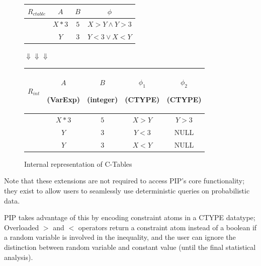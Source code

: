 \begin{figure}
\begin{center}
\begin{tabular}{c|ccc}
$R_{ctable}$ & $A$ & $B$ & $\phi$ \\ \hline
& $X*3$ & $5$ & $X > Y \wedge Y > 3$ \\
& $Y$ & $3$ & $Y < 3 \vee X < Y$ \\
\end{tabular}
\begin{center}
$\Downarrow \Downarrow \Downarrow$
\end{center}
\begin{tabular}{c|cccc}
$R_{int}$ & $A$ \begin{footnotesize}(VarExp)\end{footnotesize} & $B$ \begin{footnotesize}(integer)\end{footnotesize} & $\phi_1$ \begin{footnotesize}(CTYPE)\end{footnotesize}& $\phi_2$  \begin{footnotesize}(CTYPE)\end{footnotesize} \\ \hline
& $X*3$ & $5$ & $X > Y$ & $Y > 3$ \\
& $Y$ & $3$ & $Y < 3$ & NULL \\
& $Y$ & $3$ & $X < Y$ & NULL \\
\end{tabular}
\caption{Internal representation of C-Tables}
\label{fig:intrep}
\end{center}
\vspace*{-0.3in}
\end{figure}



Note that these extensions are not required to access PIP's core functionality; they exist to allow users to seamlessly use deterministic queries on probabilistic data.

PIP takes advantage of this by encoding constraint atoms in a CTYPE datatype; Overloaded $>$ and $<$ operators return a constraint atom instead of a boolean if a random variable is involved in the inequality, and the user can ignore the distinction between random variable and constant value (until the final statistical analysis).


